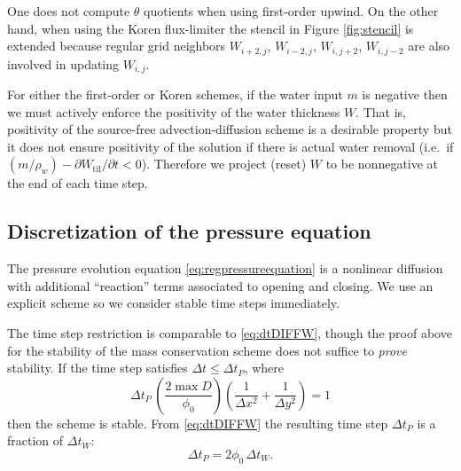 \documentclass[gmd]{copernicus}   %
\newcommand{\text}{\textrm}
\newcommand{\Wtil}{W_{\text{til}}}
\begin{document}
One does not compute $\theta$ quotients when using first-order upwind.  On the other hand, when using the Koren flux-limiter the stencil in Figure \ref{fig:stencil} is extended because regular grid neighbors $W_{i+2,j}$, $W_{i-2,j}$, $W_{i,j+2}$, $W_{i,j-2}$ are also involved in updating $W_{i,j}$.

For either the first-order or Koren schemes, if the water input $m$ is negative then we must actively enforce the positivity of the water thickness $W$.  That is, positivity of the source-free advection-diffusion scheme is a desirable property but it does not ensure positivity of the solution if there is actual water removal (i.e.~if $(m/\rho_w) - \partial \Wtil/\partial t < 0$).  Therefore we project (reset) $W$ to be nonnegative at the end of each time step.

\subsection{Discretization of the pressure equation}  The pressure evolution equation \eqref{eq:regpressureequation} is a nonlinear diffusion with additional ``reaction'' terms associated to opening and closing.  We use an explicit scheme so we consider stable time steps immediately.

The time step restriction is comparable to \eqref{eq:dtDIFFW}, though the proof above for the stability of the mass conservation scheme does not suffice to \emph{prove} stability.  If the time step satisfies $\Delta t \le \Delta t_P$, where
\begin{equation}
\Delta t_P\, \left(\frac{2 \max D}{\phi_0}\right) \left(\frac{1}{\Delta x^2} + \frac{1}{\Delta y^2}\right) = 1 \label{eq:dtDIFFP}
\end{equation}
then the scheme is stable.  From \eqref{eq:dtDIFFW} the resulting time step $\Delta t_P$ is a fraction of $\Delta t_W$:
\begin{equation}
\Delta t_P = 2 \phi_0\, \Delta t_W.  \label{eq:dtDIFFPfromW}
\end{equation}
\end{document}
